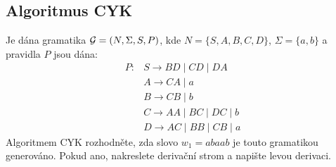 
\subsection{Algoritmus CYK} %
Je dána gramatika $\mathcal{G} = (N, \Sigma, S, P)$, kde
$N = \{S, A, B, C, D\}$, $\Sigma = \{a, b\}$ a pravidla $P$ jsou dána:
\begin{align*}
    P: & S \rightarrow BD \mid CD \mid DA \\
       & A \rightarrow CA \mid a \\
       & B \rightarrow CB \mid b \\
       & C \rightarrow AA \mid BC \mid DC \mid b \\
       & D \rightarrow AC \mid BB \mid CB \mid a
\end{align*}
Algoritmem CYK rozhodněte, zda slovo $w_1 = abaab$ je touto gramatikou generováno. Pokud ano, nakreslete derivační strom
a napište levou derivaci.

